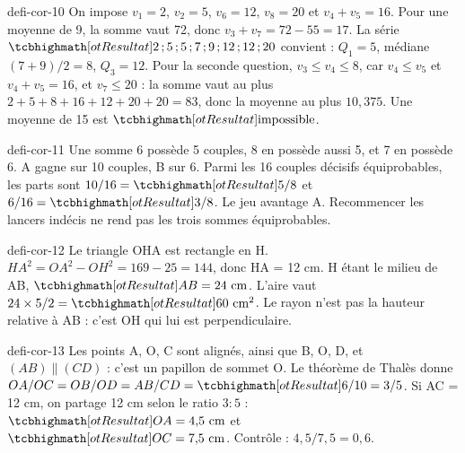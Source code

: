\begin{blocEdition}{defi-cor-10}
On impose $v_1=2$, $v_2=5$, $v_6=12$, $v_8=20$ et $v_4+v_5=16$. Pour une moyenne de 9, la somme vaut 72, donc $v_3+v_7=72-55=17$. La série $\res{2\,;5\,;5\,;7\,;9\,;12\,;12\,;20}$ convient : $Q_1=5$, médiane $(7+9)/2=8$, $Q_3=12$. Pour la seconde question, $v_3\le v_4\le8$, car $v_4\le v_5$ et $v_4+v_5=16$, et $v_7\le20$ : la somme vaut au plus $2+5+8+16+12+20+20=83$, donc la moyenne au plus $10{,}375$. Une moyenne de 15 est $\res{\text{impossible}}$.
\end{blocEdition}
\begin{blocEdition}{defi-cor-11}
Une somme 6 possède 5 couples, 8 en possède aussi 5, et 7 en possède 6. A gagne sur 10 couples, B sur 6. Parmi les 16 couples décisifs équiprobables, les parts sont $10/16=\res{5/8}$ et $6/16=\res{3/8}$. Le jeu avantage A. Recommencer les lancers indécis ne rend pas les trois sommes équiprobables.
\end{blocEdition}
\begin{blocEdition}{defi-cor-12}
Le triangle OHA est rectangle en H. $HA^2=OA^2-OH^2=169-25=144$, donc HA = 12 cm. H étant le milieu de AB, $\res{AB=24\text{ cm}}$. L’aire vaut $24\times5/2=\res{60\text{ cm}^2}$. Le rayon n’est pas la hauteur relative à AB : c’est OH qui lui est perpendiculaire.\label{fig-defi-cor-12}

\end{blocEdition}
\begin{blocEdition}{defi-cor-13}
Les points A, O, C sont alignés, ainsi que B, O, D, et $(AB)\parallel(CD)$ : c’est un papillon de sommet O. Le théorème de Thalès donne $OA/OC=OB/OD=AB/CD=\res{6/10=3/5}$. Si AC = 12 cm, on partage 12 cm selon le ratio $3:5$ : $\res{OA=4{,}5\text{ cm}}$ et $\res{OC=7{,}5\text{ cm}}$. Contrôle : $4{,}5/7{,}5=0{,}6$.\label{fig-defi-cor-13}

\end{blocEdition}

